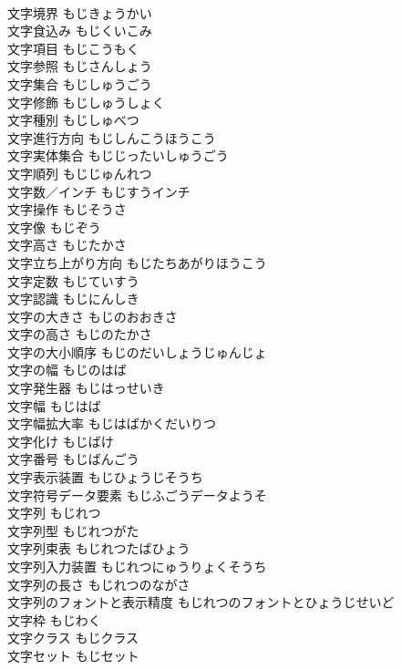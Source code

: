 \documentclass[8pt]{extreport}
\begin{document}
\begin{CJK}{UTF8}{min}
\\	文字境界	もじきょうかい	
\\	文字食込み	もじくいこみ	
\\	文字項目	もじこうもく	
\\	文字参照	もじさんしょう	
\\	文字集合	もじしゅうごう	
\\	文字修飾	もじしゅうしょく	
\\	文字種別	もじしゅべつ	
\\	文字進行方向	もじしんこうほうこう	
\\	文字実体集合	もじじったいしゅうごう	
\\	文字順列	もじじゅんれつ	
\\	文字数／インチ	もじすうインチ	
\\	文字操作	もじそうさ	
\\	文字像	もじぞう	
\\	文字高さ	もじたかさ	
\\	文字立ち上がり方向	もじたちあがりほうこう	
\\	文字定数	もじていすう	
\\	文字認識	もじにんしき	
\\	文字の大きさ	もじのおおきさ	
\\	文字の高さ	もじのたかさ	
\\	文字の大小順序	もじのだいしょうじゅんじょ	
\\	文字の幅	もじのはば	
\\	文字発生器	もじはっせいき	
\\	文字幅	もじはば	
\\	文字幅拡大率	もじはばかくだいりつ	
\\	文字化け	もじばけ	
\\	文字番号	もじばんごう	
\\	文字表示装置	もじひょうじそうち	
\\	文字符号データ要素	もじふごうデータようそ	
\\	文字列	もじれつ	
\\	文字列型	もじれつがた	
\\	文字列束表	もじれつたばひょう	
\\	文字列入力装置	もじれつにゅうりょくそうち	
\\	文字列の長さ	もじれつのながさ	
\\	文字列のフォントと表示精度	もじれつのフォントとひょうじせいど	
\\	文字枠	もじわく	
\\	文字クラス	もじクラス	
\\	文字セット	もじセット	

\end{CJK}
\end{document}
